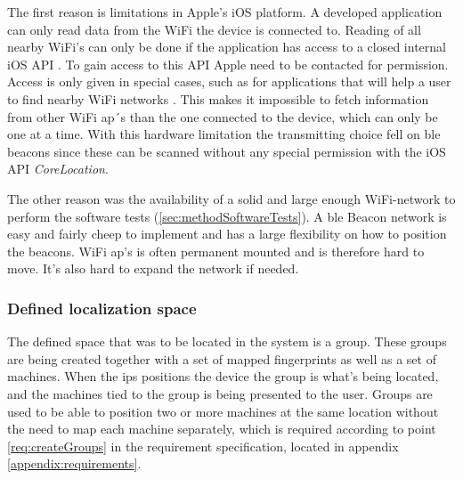 \bigskip

The first reason is limitations in Apple's iOS platform.
A developed application can only read data from the WiFi the device is connected to.
Reading of all nearby WiFi's can only be done if the application has access to a closed internal iOS API \cite{NEHotspotHelperAppleDeveloper}.
To gain access to this API Apple need to be contacted for permission.
Access is only given in special cases, such as for applications that will help a user to find nearby WiFi networks \cite{TechnicalQA1942IOS}.
This makes it impossible to fetch information from other WiFi \acrshort{ap}´s than the one connected to the device, which can only be one at a time.
With this hardware limitation the transmitting choice fell on \acrshort{ble} beacons since these can be scanned without any special permission with the iOS API \textit{CoreLocation}.

\bigskip

The other reason was the availability of a solid and large enough WiFi-network to perform the software tests (\cref{sec:methodSoftwareTests}).
A \acrshort{ble} Beacon network is easy and fairly cheep to implement and has a large flexibility on how to position the beacons.
WiFi \acrshort{ap}'s is often permanent mounted and is therefore hard to move.
It's also hard to expand the network if needed.


\subsubsection{Defined localization space}\label{sec:methodSoftwareDesignDefinedSpace} The defined space that was to be located in the system is a group.
These groups are being created together with a set of mapped fingerprints as well as a set of machines.
When the \acrshort{ips} positions the device the group is what's being located, and the machines tied to the group is being presented to the user.
Groups are used to be able to position two or more machines at the same location without the need to map each machine separately, which is required according to point \ref{req:createGroups} in the requirement specification, located in appendix \ref{appendix:requirements}.
